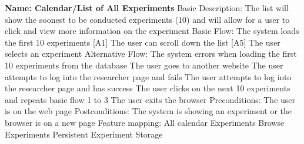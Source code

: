 \begin{outline}[enumerate]
\1 {\bf Name: Calendar/List of All Experiments}
\2 Basic Description: The list will show the soonest to be conducted experiments (10) and will allow for a user to click and view more information on the experiment
\2 Basic Flow:
\3 The system loads the first 10 experiments [A1]
\3 The user can scroll down the list [A5]
\3 The user selects an experiment
\2 Alternative Flow:
\3 [A1] The system errors when loading the first 10 experiments from the database
\3 [A2] The user goes to another website
\3 [A3] The user attempts to log into the researcher page and fails
\3 [A4] The user attempts to log into the researcher page and has success
\3 [A5] The user clicks on the next 10 experiments and repeats basic flow 1 to 3
\3 [A6] The user exits the browser
\2 Preconditions:
\3 The user is on the web page
\2 Postconditions:
\3 The system is showing an experiment or the browser is on a new page
\2 Feature mapping:
\3 All calendar Experiments
\3 Browse Experiments
\3 Persistent Experiment Storage
\end{outline}